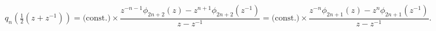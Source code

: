 \[q_{n}\left(\tfrac{1}{2}(z+z^{-1})\right)={\text{(const.)}\times\frac{z^{-n-1}%
\phi_{2n+2}(z)-z^{n+1}\phi_{2n+2}(z^{-1})}{z-z^{-1}}}={\text{(const.)}\times%
\frac{z^{-n}\phi_{2n+1}(z)-z^{n}\phi_{2n+1}(z^{-1})}{z-z^{-1}}}.\]